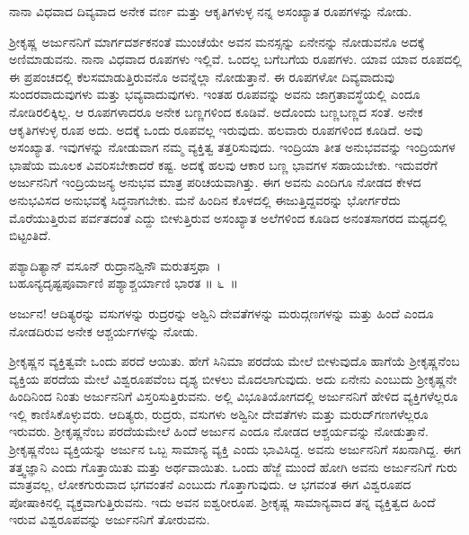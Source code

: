 \begin{artha}
ನಾನಾ ವಿಧವಾದ ದಿವ್ಯವಾದ ಅನೇಕ ವರ್ಣ ಮತ್ತು ಆಕೃತಿಗಳುಳ್ಳ ನನ್ನ ಅಸಂಖ್ಯಾತ ರೂಪಗಳನ್ನು ನೋಡು.
\end{artha}

ಶ‍್ರೀಕೃಷ್ಣ ಅರ್ಜುನನಿಗೆ ಮಾರ್ಗದರ್ಶಕನಂತೆ ಮುಂಚೆಯೇ ಅವನ ಮನಸ್ಸನ್ನು ಏನೇನನ್ನು ನೋಡುವನೊ ಅದಕ್ಕೆ ಅಣಿಮಾಡುವನು. ನಾನಾ ವಿಧವಾದ ರೂಪಗಳು ಇಲ್ಲಿವೆ. ಒಂದಲ್ಲ ಬಗೆಬಗೆಯ ರೂಪಗಳು. ಯಾವ ಯಾವ ರೂಪದಲ್ಲಿ ಈ ಪ್ರಪಂಚದಲ್ಲಿ ಕೆಲಸಮಾಡುತ್ತಿರುವನೊ ಅವನ್ನೆಲ್ಲಾ ನೋಡುತ್ತಾನೆ. ಈ ರೂಪಗಳೋ ದಿವ್ಯವಾದುವು ಸುಂದರವಾದುವುಗಳು ಮತ್ತು ಭವ್ಯವಾದುವುಗಳು. ಇಂತಹ ರೂಪವನ್ನು ಅವನು ಜಾಗ್ರತಾವಸ್ಥೆಯಲ್ಲಿ ಎಂದೂ ನೋಡಿರಲಿಕ್ಕಿಲ್ಲ. ಆ ರೂಪಗಳಾದರೂ ಅನೇಕ ಬಣ್ಣಗಳಿಂದ ಕೂಡಿವೆ. ಅದೊಂದು ಬಣ್ಣಬಣ್ಣದ ಸಂತೆ. ಅನೇಕ ಆಕೃತಿಗಳುಳ್ಳ ರೂಪ ಅದು. ಅದಕ್ಕೆ ಒಂದು ರೂಪವಲ್ಲ ಇರುವುದು. ಹಲವಾರು ರೂಪಗಳಿಂದ ಕೂಡಿದೆ. ಅವು ಅಸಂಖ್ಯಾತ. ಇವುಗಳನ್ನು ನೋಡುವಾಗ ನಮ್ಮ ವ್ಯಕ್ತಿತ್ವ ತತ್ತರಿಸುವುದು. ಇಂದ್ರಿಯಾ ತೀತ ಅನುಭವವನ್ನು ಇಂದ್ರಿಯಗಳ ಭಾಷೆಯ ಮೂಲಕ ವಿವರಿಸಬೇಕಾದರೆ ಕಷ್ಟ. ಅದಕ್ಕೆ ಹಲವು ಆಕಾರ ಬಣ್ಣ ಭಾವಗಳ ಸಹಾಯಬೇಕು. ಇದುವರೆಗೆ ಅರ್ಜುನನಿಗೆ ಇಂದ್ರಿಯಜನ್ಯ ಅನುಭವ ಮಾತ್ರ ಪರಿಚಯವಾಗಿತ್ತು. ಈಗ ಅವನು ಎಂದಿಗೂ ನೋಡದ ಕೇಳದ ಅನುಭವಿಸದ ಅನುಭವಕ್ಕೆ ಸಿದ್ಧನಾಗಬೇಕು. ಮನೆ ಹಿಂದಿನ ಕೊಳದಲ್ಲಿ ಈಜುತ್ತಿದ್ದವರನ್ನು ಭೋರ್ಗರೆದು ಮೊರೆಯುತ್ತಿರುವ ಪರ್ವತದಂತೆ ಎದ್ದು ಬೀಳುತ್ತಿರುವ ಅಸಂಖ್ಯಾತ ಅಲೆಗಳಿಂದ ಕೂಡಿದ ಅನಂತಸಾಗರದ ಮಧ್ಯದಲ್ಲಿ ಬಿಟ್ಟಂತಿದೆ.

\begin{shloka}
ಪಶ್ಯಾದಿತ್ಯಾನ್ ವಸೂನ್ ರುದ್ರಾನಶ್ವಿನೌ ಮರುತಸ್ತಥಾ~।\\ಬಹೂನ್ಯದೃಷ್ಟಪೂರ್ವಾಣಿ ಪಶ್ಯಾಶ್ಚರ್ಯಾಣಿ ಭಾರತ \hfill॥ ೬~॥
\end{shloka}

\begin{artha}
ಅರ್ಜುನ! ಆದಿತ್ಯರನ್ನು ವಸುಗಳನ್ನು ರುದ್ರರನ್ನು ಅಶ್ವಿನಿ ದೇವತೆಗಳನ್ನು ಮರುದ್ಗಣಗಳನ್ನು ಮತ್ತು ಹಿಂದೆ ಎಂದೂ ನೋಡದಿರುವ ಅನೇಕ ಆಶ್ಚರ್ಯಗಳನ್ನು ನೋಡು.
\end{artha}

ಶ‍್ರೀಕೃಷ್ಣನ ವ್ಯಕ್ತಿತ್ವವೇ ಒಂದು ಪರದೆ ಆಯಿತು. ಹೇಗೆ ಸಿನಿಮಾ ಪರದೆಯ ಮೇಲೆ ಬೀಳುವುದೊ ಹಾಗೆಯೆ ಶ‍್ರೀಕೃಷ್ಣನೆಂಬ ವ್ಯಕ್ತಿಯ ಪರದೆಯ ಮೇಲೆ ವಿಶ್ವರೂಪವೆಂಬ ದೃಶ್ಯ ಬೀಳಲು ಮೊದಲಾಗುವುದು. ಅದು ಏನೇನು ಎಂಬುದು ಶ‍್ರೀಕೃಷ್ಣನೇ ಹಿಂದಿನಿಂದ ನಿಂತು ಅರ್ಜುನನಿಗೆ ವಿಸ್ತರಿಸುತ್ತಿರುವನು. ಅಲ್ಲಿ ವಿಭೂತಿಯೋಗದಲ್ಲಿ ಅರ್ಜುನನಿಗೆ ಹೇಳಿದ ವ್ಯಕ್ತಿ\-ಗಳೆಲ್ಲರೂ ಇಲ್ಲಿ ಕಾಣಿಸಿಕೊಳ್ಳುವರು. ಆದಿತ್ಯರು, ರುದ್ರರು, ವಸುಗಳು ಅಶ್ವಿನೀ ದೇವತೆಗಳು ಮತ್ತು ಮರುದ್​ಗಣಗಳೆಲ್ಲರೂ ಇರುವರು. ಶ‍್ರೀಕೃಷ್ಣನೆಂಬ ಪರದೆಯಮೇಲೆ ಹಿಂದೆ ಅರ್ಜುನ ಎಂದೂ ನೋಡದ ಆಶ್ಚರ್ಯವನ್ನು ನೋಡುತ್ತಾನೆ. ಶ‍್ರೀಕೃಷ್ಣನೆಂಬ ವ್ಯಕ್ತಿಯನ್ನು ಅರ್ಜುನ ಒಬ್ಬ ಸಾಮಾನ್ಯ ವ್ಯಕ್ತಿ ಎಂದು ಭಾವಿಸಿದ್ದ. ಅವನು ಅರ್ಜುನನಿಗೆ ಸಖನಾಗಿದ್ದ. ಈಗ ತತ್ತ್ವಜ್ಞಾನಿ ಎಂದು ಗೊತ್ತಾಯಿತು ಮತ್ತು ಅರ್ಥವಾಯಿತು. ಒಂದು ಹೆಜ್ಜೆ ಮುಂದೆ ಹೋಗಿ ಅವನು ಅರ್ಜುನನಿಗೆ ಗುರು ಮಾತ್ರವಲ್ಲ, ಲೋಕಗುರುವಾದ ಭಗವಂತನೆ ಎಂಬುದು ಗೊತ್ತಾಗುವುದು. ಆ ಭಗವಂತ ಈಗ ವಿಶ್ವರೂಪದ ಪೋಷಾಕಿನಲ್ಲಿ ವ್ಯಕ್ತವಾಗುತ್ತಿರುವನು. ಇದು ಅವನ ಐಶ್ವರೀರೂಪ. ಶ‍್ರೀಕೃಷ್ಣ ಸಾಮಾನ್ಯವಾದ ತನ್ನ ವ್ಯಕ್ತಿತ್ವದ ಹಿಂದೆ ಇರುವ ವಿಶ್ವರೂಪವನ್ನು ಅರ್ಜುನನಿಗೆ ತೋರುವನು.

